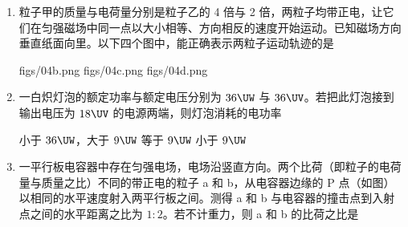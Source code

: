 \documentclass[\gkver]{gaokaozhenti}
\begin{document}
\begin{enumerate}
\onepicture[h=3.45cm]{}

{合上开关，b 先亮，a 后亮；断开开关，a 先熄灭，b 后熄灭}
{合上开关，b 先亮，a 后亮；断开开关，a、b 同时熄灭}
{合上开关，a、b 同时亮；断开开关，b 先熄灭，a 后熄灭}


\item
粒子甲的质量与电荷量分别是粒子乙的 4 倍与 2 倍，两粒子均带正电，让它们在匀强磁场中同一点以大小相等、方向相反的速度开始运动。已知磁场方向垂直纸面向里。以下四个图中，能正确表示两粒子运动轨迹的是

{figs/04b.png}
{figs/04c.png}
{figs/04d.png}


\item
一白炽灯泡的额定功率与额定电压分别为 $36\UW$ 与 $36\UV$。若把此灯泡接到输出电压为 $18\UV$ 的电源两端，则灯泡消耗的电功率

{小于 $36\UW$，大于 $9\UW$}
{等于 $9\UW$}
{小于 $9\UW$}


\item
一平行板电容器中存在匀强电场，电场沿竖直方向。两个比荷（即粒子的电荷量与质量之比）不同的带正电的粒子 a 和 b，从电容器边缘的 P 点（如图）以相同的水平速度射入两平行板之间。测得 a 和 b 与电容器的撞击点到入射点之间的水平距离之比为 $1:2$。若不计重力，则 a 和 b 的比荷之比是


\end{enumerate}
\end{document}
